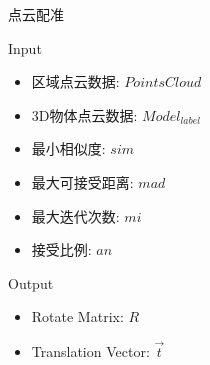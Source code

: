 \documentclass[xcolor=table,notheorems,compress,blue]{beamer}
\begin{document}
	\begin{frame}{点云配准}
		\begin{exampleblock}{Input}
			\begin{itemize}		
				\item  区域点云数据: $Points Cloud$
				\item  3D物体点云数据: $Model_{label}$
				\item  最小相似度: $sim$
				\item  最大可接受距离: $mad$
				\item  最大迭代次数: $mi$ 
				\item  接受比例: $an$
			\end{itemize}
		\end{exampleblock}
		\begin{exampleblock}{Output}
			\begin{itemize}
				\item Rotate Matrix: $R$
				\item Translation Vector: $\vec t$ 
			\end{itemize}
		\end{exampleblock}
	\end{frame}
	
\end{document}
